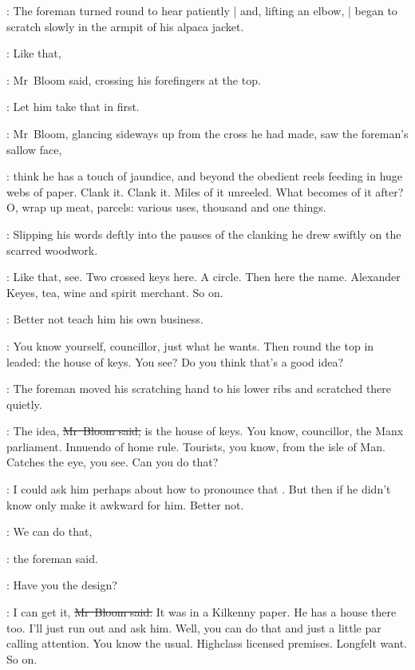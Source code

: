 :
The foreman turned round to hear patiently |
and, lifting an elbow, |
began to scratch slowly in the armpit of his alpaca jacket.

\Bloom:
Like that,

:
Mr~Bloom said,
crossing his forefingers at the top.

\BloomInt:
Let him take that in first.

:
Mr~Bloom,
glancing sideways up from the cross he had made,
saw the foreman's sallow face,

\BloomInt:
think he has a touch of jaundice,
and beyond
the obedient reels feeding in huge webs of paper.
Clank it.
Clank it.
Miles of it unreeled.
What becomes of it after?
O, wrap up meat, parcels:
various uses,
thousand and one things.

:
Slipping his words deftly into the pauses of the clanking
he drew swiftly
on the scarred woodwork.



\Bloom:
Like that, see.
Two crossed keys here.
A circle.
Then here the name.
Alexander Keyes,
tea, wine and spirit merchant.
So on.

\BloomInt:
Better not teach him his own business.

\Bloom:
You know yourself, councillor,
just what he wants.
Then round the top in leaded:
the house of keys.
You see?
Do you think that's a good idea?

:
The foreman moved his scratching hand to his lower ribs
and scratched there quietly.

\Bloom:
The idea,
\sout{Mr~Bloom said,}
is the house of keys.
You know, councillor,
the Manx parliament.
Innuendo of home rule.
Tourists, you know, from the isle of Man.
Catches the eye, you see.
Can you do that?

\BloomInt:
I could ask him perhaps about how to pronounce that .
But then if he didn't know
only make it awkward for him.
Better not.

\foreman:
We can do that,

:
the foreman said.

\foreman:
Have you the design?

\Bloom:
I can get it,
\sout{Mr~Bloom said.}
It was in a Kilkenny paper.
He has a house there too.
I'll just run out and ask him.
Well, you can do that and just a little par calling attention.
You know the usual.
Highclass licensed premises.
Longfelt want.
So on.

